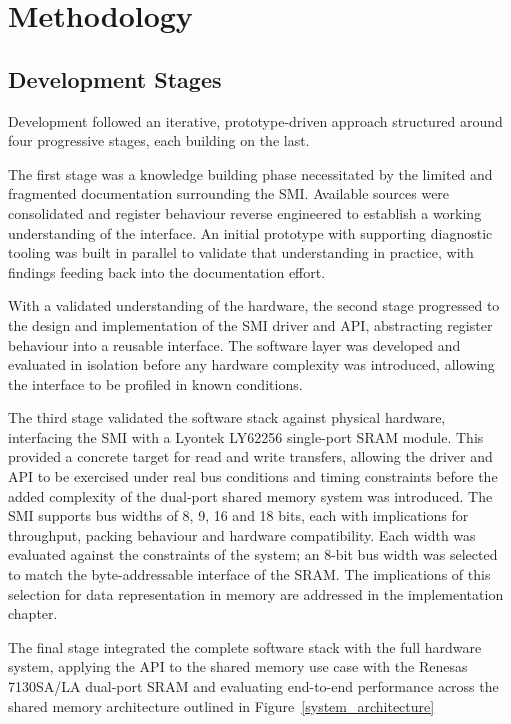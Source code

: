 \documentclass[final]{cmpreport}
\begin{document}
\section{Methodology}

\subsection{Development Stages}
Development followed an iterative, prototype-driven approach structured around four progressive stages, each building on the last.

The first stage was a knowledge building phase necessitated by the limited and fragmented documentation surrounding the SMI. Available sources were consolidated and register behaviour reverse engineered to establish a working understanding of the interface. An initial prototype with supporting diagnostic tooling was built in parallel to validate that understanding in practice, with findings feeding back into the documentation effort.

With a validated understanding of the hardware, the second stage progressed to the design and implementation of the SMI driver and API, abstracting register behaviour into a reusable interface. The software layer was developed and evaluated in isolation before any hardware complexity was introduced, allowing the interface to be profiled in known conditions.

The third stage validated the software stack against physical hardware, interfacing the SMI with a Lyontek LY62256 single-port SRAM module. This provided a concrete target for read and write transfers, allowing the driver and API to be exercised under real bus conditions and timing constraints before the added complexity of the dual-port shared memory system was introduced. The SMI supports bus widths of 8, 9, 16 and 18 bits, each with implications for throughput, packing behaviour and hardware compatibility. Each width was evaluated against the constraints of the system; an 8-bit bus width was selected to match the byte-addressable interface of the SRAM\@. The implications of this selection for data representation in memory are addressed in the implementation chapter.

The final stage integrated the complete software stack with the full hardware system, applying the API to the shared memory use case with the Renesas 7130SA/LA dual-port SRAM and evaluating end-to-end performance across the shared memory architecture outlined in Figure~\ref{system_architecture}
\end{document}
